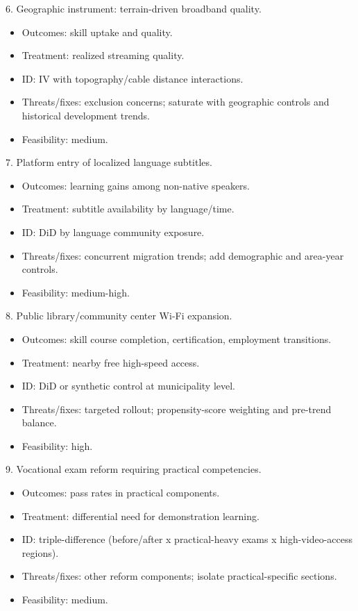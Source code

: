 \documentclass[11pt]{article}
\begin{document}
6. Geographic instrument: terrain-driven broadband quality.\\
\begin{itemize}
\item Outcomes: skill uptake and quality.
\item Treatment: realized streaming quality.
\item ID: IV with topography/cable distance interactions.
\item Threats/fixes: exclusion concerns; saturate with geographic controls and historical development trends.
\item Feasibility: medium.
\end{itemize}

7. Platform entry of localized language subtitles.\\
\begin{itemize}
\item Outcomes: learning gains among non-native speakers.
\item Treatment: subtitle availability by language/time.
\item ID: DiD by language community exposure.
\item Threats/fixes: concurrent migration trends; add demographic and area-year controls.
\item Feasibility: medium-high.
\end{itemize}

8. Public library/community center Wi-Fi expansion.\\
\begin{itemize}
\item Outcomes: skill course completion, certification, employment transitions.
\item Treatment: nearby free high-speed access.
\item ID: DiD or synthetic control at municipality level.
\item Threats/fixes: targeted rollout; propensity-score weighting and pre-trend balance.
\item Feasibility: high.
\end{itemize}

9. Vocational exam reform requiring practical competencies.\\
\begin{itemize}
\item Outcomes: pass rates in practical components.
\item Treatment: differential need for demonstration learning.
\item ID: triple-difference (before/after x practical-heavy exams x high-video-access regions).
\item Threats/fixes: other reform components; isolate practical-specific sections.
\item Feasibility: medium.
\end{itemize}
\end{document}
